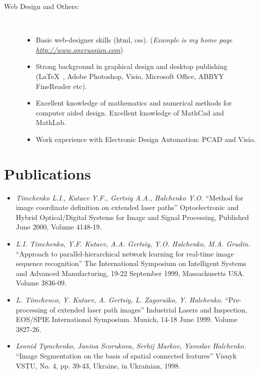 \documentclass[10pt,overlapped,line]{res}
\newcommand{\wdescription}[1]{({\small \textit{#1}})}
\newcommand{\mtitle}[1]{``#1''}
\newcommand{\mauthors}[1]{ \textit{#1.}}
\newcommand{\mwhere}[1]{#1.}
\begin{document}
\begin{resume}
\begin{description}
   \item[Web Design and Others:]  \hspace*{\fill} \\
     \begin{itemize}
     \item Basic web-designer skills (html, css).
       \wdescription{Example is my home page \href{URL}{http://www.onerussian.com}}
     \item Strong background in graphical design and desktop
       publishing (\LaTeX\ , Adobe Photoshop, Visio, Microsoft Office, ABBYY
       FineReader etc).
     \item Excellent knowledge of mathematics and numerical methods
       for computer aided design. Excellent knowledge of MathCad and
       MathLab.
     \item Work experience with Electronic Design Automation: PCAD and
       Visio.
     \end{itemize}
 \end{description}

\section{Publications}

\begin{itemize}
 
 \item 
    \mauthors{Timchenko L.I., Kutaev Y.F., Gertsiy A.A., Halchenko Y.O}
    \mtitle{Method for image coordinate definition on extended laser paths} 
    \mwhere{Optoelectronic and Hybrid Optical/Digital Systems for Image and Signal Processing, Published June 2000,  Volume 4148-19}

 \item 
    \mauthors{L.I. Timchenko, Y.F. Kutaev, A.A. Gertsiy, Y.O. Halchenko,
    M.A. Grudin} 
    \mtitle{Approach to parallel-hierarchical network learning for real-time image sequence recognition} 
    \mwhere{The International Symposium on Intelligent Systems and Advanced Manufacturing, 19-22 September 1999, Massachusetts USA. Volume 3836-09}

  \item 
    \mauthors{L. Timchenco, Y. Kutaev, A. Gertsiy, L. Zagoruiko, Y. Halchenko} 
    \mtitle{Pre-processing of extended laser path images} 
    \mwhere{Industrial Lasers and Inspection, EOS/SPIE International Symposium. Munich, 14-18 June 1999. Volume 3827-26}

  \item 
    \mauthors{Leonid Tymchenko, Janina Scorukova, Serhij Markov, Yaroslav Halchenko} 
    \mtitle{Image Segmentation on the basis of spatial connected features} 
    \mwhere{Visnyk VSTU, No. 4, pp. 39-43, Ukraine, in Ukrainian, 1998}


\end{itemize}
\end{resume}
\end{document}
